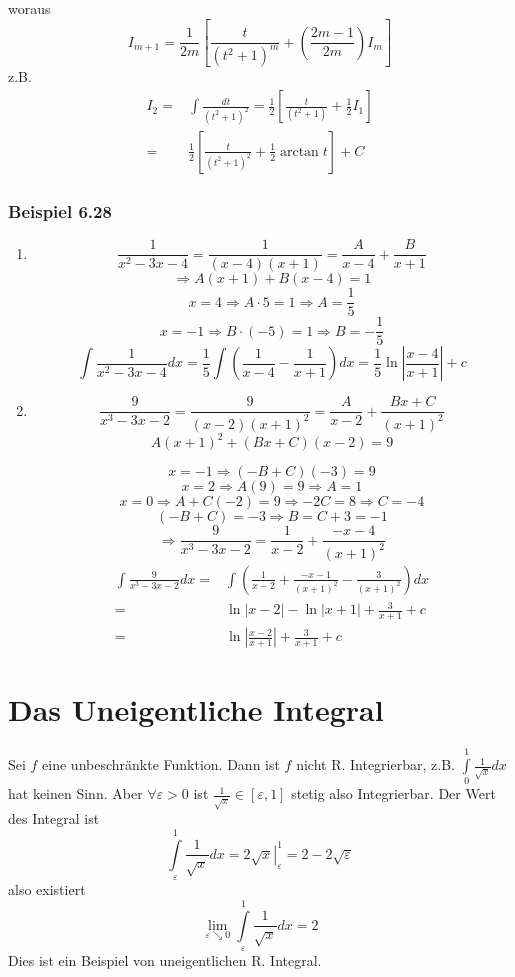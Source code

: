 \begin{itemize}
woraus \[I_{m+1}=\frac{1}{2m}\left[\frac{t}{(t^2 +1)^m} + \left(\frac{2m-1}{2m}\right)I_m\right]\]
z.B.
\begin{align*}
I_2=&\int{\frac{dt}{(t^2 +1)^2}}=\frac{1}{2}\left[ \frac{t}{(t^2 +1)}+\frac{1}{2}I_1\right]\\
=&\frac{1}{2}\left[ \frac{t}{(t^2 +1)^2}+\frac{1}{2}\arctan t\right] + C
\end{align*}

\end{itemize}
\subsubsection*{Beispiel 6.28}
\begin{enumerate}
\item \[\frac{1}{x^2 -3x -4}=\frac{1}{(x-4)(x+1)}=\frac{A}{x-4}+\frac{B}{x+1}\]
\[\Rightarrow A(x+1)+B(x-4)=1\]
\[x=4\Rightarrow A\cdot 5=1\Rightarrow A=\frac{1}{5}\]
\[x=-1\Rightarrow B\cdot (-5)=1\Rightarrow B=-\frac{1}{5}\]
\[\int {\frac{1}{{{x^2} - 3x - 4}}dx = \frac{1}{5}\int {\left( {\frac{1}{{x - 4}} - \frac{1}{{x + 1}}} \right)dx = \frac{1}{5}} } \ln \left| {\frac{{x - 4}}{{x + 1}}} \right| + c\]
\item \[\frac{9}{{{x^3} - 3x - 2}} = \frac{9}{{(x - 2){{(x + 1)}^2}}} = \frac{A}{{x - 2}} + \frac{{Bx + C}}{{{{(x + 1)}^2}}}\]
\[A{(x + 1)^2} + (Bx + C)(x - 2) = 9\]

\[x=-1\Rightarrow(-B+C)(-3)=9\]
\[x=2\Rightarrow A(9)=9\Rightarrow A=1\]
\[x=0\Rightarrow A+C(-2)=9\Rightarrow -2C=8\Rightarrow C=-4\]
\[(-B+C)=-3\Rightarrow B=C+3=-1\]
\[\Rightarrow \frac{9}{x^3-3x-2}=\frac{1}{x-2}+\frac{-x-4}{(x+1)^2}\]
\begin{align*}
\int \frac{9}{{{x^3} - 3x - 2}}dx =&\int {\left( {\frac{1}{{x - 2}} + \frac{{ - x - 1}}{{{{(x + 1)}^2}}} - \frac{3}{{{{(x + 1)}^2}}}} \right)dx} \\
 =&\ln \left| {x - 2} \right| - \ln \left| {x + 1} \right| + \frac{3}{{x + 1}} + c\\
 =&\ln \left| {\frac{{x - 2}}{{x + 1}}} \right| + \frac{3}{{x + 1}} + c
\end{align*}
\end{enumerate}
\section{Das Uneigentliche Integral}
Sei $f$ eine unbeschränkte Funktion. Dann ist $f$ nicht R. Integrierbar, z.B. $\int\limits_0^1 {\frac{1}{{\sqrt x }}} dx$ hat keinen Sinn. Aber $\forall\varepsilon>0$ ist $\frac{1}{\sqrt{x}}\in\left[\varepsilon,1 \right]$ stetig also Integrierbar. Der Wert des Integral ist \[\int\limits_\varepsilon ^1 {\frac{1}{{\sqrt x }}} dx = \left. {2\sqrt x } \right|_\varepsilon ^1 = 2 - 2\sqrt \varepsilon  \] also existiert \[\mathop {\lim }\limits_{\varepsilon  \searrow 0} \int\limits_\varepsilon ^1 {\frac{1}{{\sqrt x }}} dx = 2\] Dies ist ein Beispiel von uneigentlichen R. Integral.

